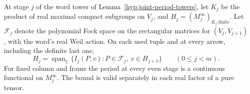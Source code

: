 \begin{auxlemma}
\label{lem:word-real-tests-period}
At stage \(j\) of the word tower of Lemma~\ref{hyp:joint-period-towers},
let \(K_j\) be the product of real maximal compact subgroups on
\(V_j\), and \(H_j=(M_j^\infty)_{K_j\text{-finite}}\).
Let \(\mathcal F_j\) denote the polynomial Fock space on the rectangular
matrices for \((V_j,V_{j+1})\), with the word's real Weil action.
On each used tuple and at every arrow, including the definite last one,
\[
 H_j=\operatorname{span}_{\mathbb C}
         \{I_j(P,v):P\in\mathcal F_j,\ v\in H_{j+1}\}
             \qquad(0\le j<m).
\]
For fixed column and frame the period at every even stage is a
continuous functional on \(M_j^\infty\). The bound is valid separately
in each real factor of a pure tensor.
\end{auxlemma}
